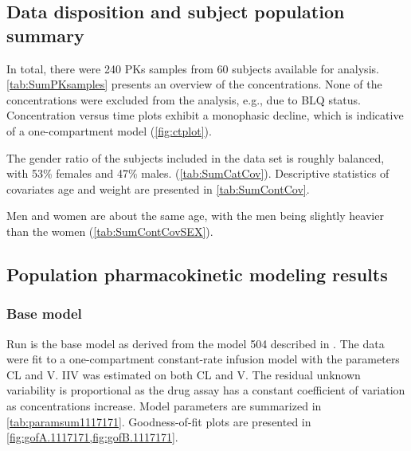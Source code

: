 
\subsection{Data disposition and subject population summary}

 In total, there were 240 \glspl{PK} samples from 60 subjects available for analysis. \cref{tab:SumPKsamples} presents an overview of the concentrations. None of the concentrations were excluded from the analysis, e.g., due to \gls{BLQ} status.  Concentration versus time plots exhibit a monophasic decline, which is indicative of a one-compartment model (\cref{fig:ctplot}). 



The gender ratio of the subjects included in the data set is roughly balanced, with 53\% females and 47\% males. (\cref{tab:SumCatCov}).  Descriptive statistics of covariates age and weight are presented in \cref{tab:SumContCov}. 




Men and women are about the same age, with the men being slightly heavier than the women (\cref{tab:SumContCovSEX}).




\clearpage

\subsection{Population pharmacokinetic modeling results}

\subsubsection{Base model}
  
Run  is the base model as derived from the model 504 described in \autocite[p.~536]{Bauer2019}. The data were fit to a one-­compartment constant-­rate infusion model with the parameters \gls{CL} and \gls{V}. \Gls{IIV} was estimated on both \gls{CL} and \gls{V}. The residual unknown variability is proportional as the drug assay has a constant coefficient of variation as concentrations increase. Model parameters are summarized in \cref{tab:paramsum1117171}. Goodness-of-fit plots are presented in \cref{fig:gofA.1117171,fig:gofB.1117171}. 

